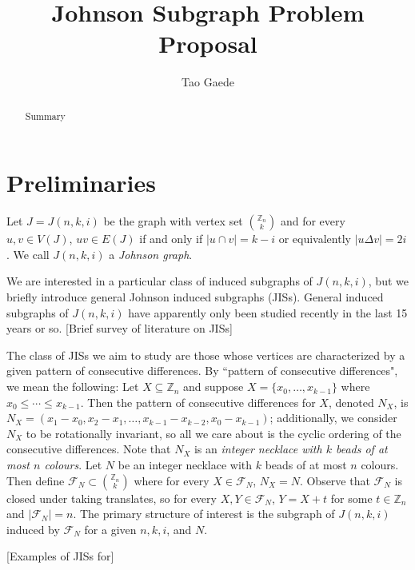 \documentclass[12]{article}
\title{ \vspace{-3cm} Johnson Subgraph Problem Proposal }
\author{Tao Gaede}
\newcommand{\Z}{\mathbb{Z}}
\theoremstyle{definition}
\begin{document}
	\maketitle
	
	\begin{abstract}
		Summary
	\end{abstract}

	\section{Preliminaries}
	Let $J = J(n,k,i)$ be the graph with vertex set ${\Z_n \choose k}$ and for every $u,v \in V(J)$, $uv \in E(J)$ if and only if $|u \cap v| = k-i$ or equivalently $|u \Delta v| = 2i$.  We call $J(n,k,i)$ a \emph{Johnson graph}.
	
	We are interested in a particular class of induced subgraphs of $J(n,k,i)$, but we briefly introduce general Johnson induced subgraphs (JISs).  General induced subgraphs of $J(n,k,i)$ have apparently only been studied recently in the last 15 years or so. [Brief survey of literature on JISs]
	
	The class of JISs we aim to study are those whose vertices are characterized by a given pattern of consecutive differences.  By ``pattern of consecutive differences", we mean the following: Let $X \subseteq \Z_n$ and suppose $X = \{x_0,\ldots,x_{k-1}\}$ where $x_0 \leq \cdots \leq x_{k-1}$.  Then the pattern of consecutive differences for $X$, denoted $N_X$, is $N_X = (x_1-x_0,x_2-x_1,\ldots,x_{k-1} - x_{k-2}, x_0 - x_{k-1})$; additionally, we consider $N_X$ to be rotationally invariant, so all we care about is the cyclic ordering of the consecutive differences.  Note that $N_X$ is an \emph{integer necklace with $k$ beads of at most $n$ colours}.    Let $N$ be an integer necklace with $k$ beads of at most $n$ colours.  Then define $\mathcal{F}_N \subset {\Z_n \choose k}$ where for every $X \in \mathcal{F}_N$, $N_X = N$.  Observe that $\mathcal{F}_N$ is closed under taking translates, so for every $X,Y \in \mathcal{F}_N$, $Y = X + t$ for some $t \in \Z_n$ and $|\mathcal{F}_N| = n$.  The primary structure of interest is the subgraph of $J(n,k,i)$ induced by $\mathcal{F}_N$ for a given $n,k,i$, and $N$.
	
	[Examples of JISs for]
	
\end{document}
